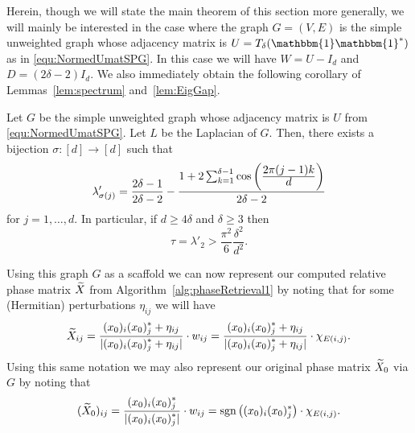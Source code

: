 Herein, though we will state the main theorem of this section more generally, we will mainly be interested in the case where the graph $G=(V,E)$ is the simple unweighted graph whose adjacency matrix is $U = T_{\delta}(\mathbbm{1} \mathbbm{1}^*)$ as in \eqref{equ:NormedUmatSPG}.  In this case we will have $W = U - I_d$ and $D = (2 \delta - 2)I_d$.  We also immediately obtain the following corollary of Lemmas~\ref{lem:spectrum} and~\ref{lem:EigGap}.
\begin{corollary}
Let $G$ be the simple unweighted graph whose adjacency matrix is $U$ from \eqref{equ:NormedUmatSPG}.  Let $L$ be the Laplacian of $G$.  Then, there exists a bijection $\sigma:[d] \rightarrow [d]$ such that
$$\lambda'_{\sigma(j)} = \frac{2 \delta - 1}{2 \delta - 2} - \frac{1 + 2 \sum_{k = 1}^{\delta - 1}\cos\left(\frac{\displaystyle 2\pi (j-1) k}{\displaystyle d}\right)}{2 \delta - 2}$$
for $j = 1, \dots, d$.  In particular, if $d \geq 4 \delta$ and $\delta \geq 3$ then \[\tau = \lambda'_2 > \dfrac{\pi^2}{6} \dfrac{\delta^2}{d^2}.\]
\label{cor:Gspectrum}
\end{corollary}
Using this graph $G$ as a scaffold we can now represent our computed relative phase matrix $\widetilde{X}$ from Algorithm~\ref{alg:phaseRetrieval1} by noting that for some (Hermitian) perturbations $\eta_{ij}$ 
we will have 
\begin{equation}
\widetilde{X}_{ij} = \frac{\displaystyle (x_0)_i(x_0)_j^* + \eta_{ij}}{\displaystyle |(x_0)_i(x_0)_j^* + \eta_{ij}|} \cdot w_{ij} = \frac{\displaystyle (x_0)_i(x_0)_j^* + \eta_{ij}}{\displaystyle |(x_0)_i(x_0)_j^* + \eta_{ij}|} \cdot \chi_{E(i, j)}.
\label{equ:DeftildeXviaGcomp}
\end{equation}
 Using this same notation we may also represent our original phase matrix $\widetilde{X}_0$ %
via $G$ by noting that
\begin{equation}
(\widetilde{X}_0)_{ij} = \frac{\displaystyle (x_0)_i(x_0)_j^*}{\displaystyle |(x_0)_i(x_0)_j^*|} \cdot w_{ij} = \mathrm{sgn} \left( (x_0)_i(x_0)_j^* \right) \cdot \chi_{E(i, j)}.
\label{equ:DeftildeXviaGpure}
\end{equation}

